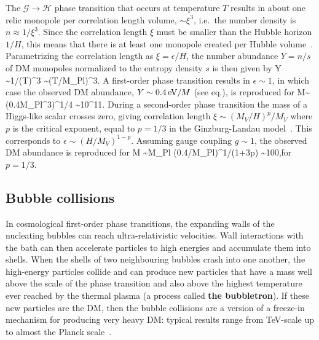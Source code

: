 The $\mathcal{G}\to \mathcal{H}$ phase transition that occurs at  temperature $T$ results 
in about one relic monopole per correlation length volume, $\sim\xi^3$, i.e.~the number density is $n \approx 1/\xi^3$.
Since the correlation length $\xi$ must be smaller than the Hubble horizon $1/H$,
this means that there is at least one monopole created
per Hubble volume~\cite{DarkMonopoles}.
Parametrizing the correlation length as  $\xi = \epsilon/H$, the number abundance $Y =n/s$ of DM monopoles normalized to the entropy density $s$ is then given by
\beq Y \sim  1/(T\xi )^3 \sim  (T/\epsilon M_{\rm Pl})^3.\eeq
A first-order phase transition results in $\epsilon \sim1$, in which case the observed DM abundance, $Y\sim 0.4\,{\rm eV}/M$ (see eq.),
is reproduced for
\beq M\sim (0.4\eV \times M_{\rm Pl}^3)^{1/4} \sim 10^{11}\GeV .\eeq
During a second-order phase transition the mass of a Higgs-like scalar
crosses zero, giving correlation length $\xi \sim (M_V/H)^p/M_V$
where $p$ is the critical exponent,  equal to $p=1/3$ in the Ginzburg-Landau model~\cite{DarkMonopoles}.
This corresponds to $\epsilon \sim (H/M_V)^{1-p}$. 
Assuming gauge coupling $g\sim 1$, the observed DM abundance is reproduced for
\beq M \sim M_{\rm Pl} (0.4\eV/M_{\rm Pl})^{1/(1+3p)} \sim 100\TeV,\qquad \hbox{for~~$p=1/3$}.\eeq


\subsection{Bubble collisions}\label{bubblecollisionsproduction}
In cosmological first-order phase transitions, the expanding walls of the nucleating bubbles can reach ultra-relativistic velocities. 
Wall interactions with the bath can then accelerate particles to high energies and accumulate them into shells. 
When the shells of two neighbouring bubbles crash into one another, 
the high-energy particles collide and can produce new particles that have a mass well above the scale of the phase transition 
and also above the highest temperature ever reached by the thermal plasma (a process called {\bf the bubbletron}). 
If these new particles are the DM, then the bubble collisions are a version of a freeze-in mechanism for producing very heavy DM: typical results range from TeV-scale up to almost the Planck scale~\cite{Bubbletron}.

\medskip

